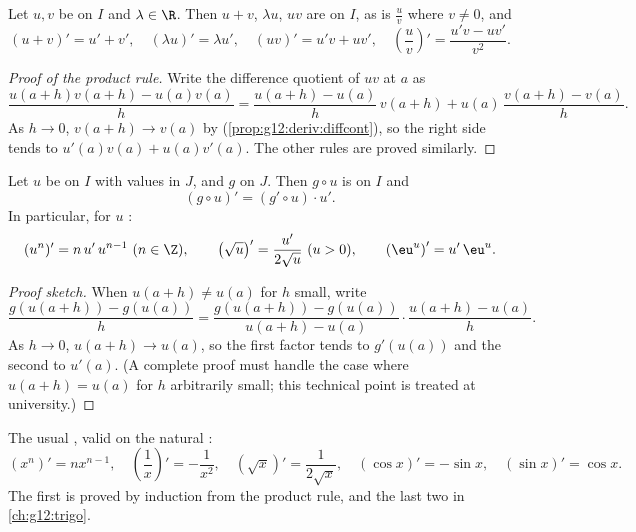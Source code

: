 \begin{proposition}[Operations]\label{prop:g12:deriv:operations}
Let $u, v$ be  on $I$ and $\lambda \in \R$. Then $u + v$,
$\lambda u$, $uv$ are  on $I$, as is $\frac{u}{v}$ where
$v \neq 0$, and
\[
(u+v)' = u' + v', \quad (\lambda u)' = \lambda u', \quad
(uv)' = u'v + uv', \quad
\left(\frac{u}{v}\right)' = \frac{u'v - uv'}{v^2}.
\]
\end{proposition}

\begin{proof}[Proof of the product rule]
Write the difference quotient of $uv$ at $a$ as
\[
\frac{u(a+h)v(a+h) - u(a)v(a)}{h}
= \frac{u(a+h) - u(a)}{h}\,v(a+h) + u(a)\,\frac{v(a+h) - v(a)}{h}.
\]
As $h \to 0$, $v(a+h) \to v(a)$ by 
(\cref{prop:g12:deriv:diffcont}), so the right side tends to
$u'(a)v(a) + u(a)v'(a)$. The other rules are proved similarly.
\end{proof}

\begin{theorem}\label{thm:g12:deriv:chain}
Let $u$ be  on $I$ with values in $J$, and $g$ 
on $J$. Then $g \circ u$ is  on $I$ and
\[
(g \circ u)' = (g' \circ u) \cdot u' .
\]
In particular, for $u$ :
\[
(u^n)' = n\,u'\,u^{n-1} \ (n \in \Z), \qquad
\left(\sqrt{u}\right)' = \frac{u'}{2\sqrt{u}} \ (u > 0), \qquad
\left(\eu^{u}\right)' = u'\,\eu^{u}.
\]
\end{theorem}

\begin{proof}[Proof sketch]
When $u(a+h) \neq u(a)$ for $h$ small, write
\[
\frac{g(u(a+h)) - g(u(a))}{h}
= \frac{g(u(a+h)) - g(u(a))}{u(a+h) - u(a)} \cdot \frac{u(a+h) - u(a)}{h}.
\]
As $h \to 0$, $u(a+h) \to u(a)$, so the first factor tends to $g'(u(a))$ and
the second to $u'(a)$. (A complete proof must handle the case where
$u(a+h) = u(a)$ for $h$ arbitrarily small; this technical point is treated at
university.)
\end{proof}

\begin{example}
The usual , valid on the natural :
\[
(x^n)' = nx^{n-1}, \quad
\left(\frac{1}{x}\right)' = -\frac{1}{x^2}, \quad
(\sqrt{x})' = \frac{1}{2\sqrt{x}}, \quad
(\cos x)' = -\sin x, \quad
(\sin x)' = \cos x .
\]
The first is proved by induction from the product rule, and the last two in
\cref{ch:g12:trigo}.
\end{example}

